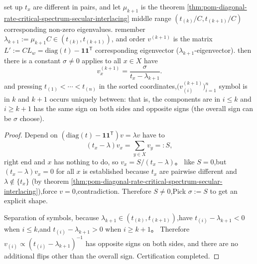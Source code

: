 \begin{proposition}\label{prop:pom-diagonal-rate-critical-eigenvector-shape-sign-separation}
set up \(t_x\) are different in pairs, and let \(\mu_{k+1}\) is the theorem \ref{thm:pom-diagonal-rate-critical-spectrum-secular-interlacing} middle range \((t_{(k)}/C,t_{(k+1)}/C)\) corresponding non-zero eigenvalues.
remember \(\lambda_{k+1}:=\mu_{k+1}C\in(t_{(k)},t_{(k+1)})\), and order \(v^{(k+1)}\) is the matrix \(L':=CL_w=\mathrm{diag}(t)-\mathbf 1\mathbf 1^{\mathsf T}\) corresponding eigenvector (\(\lambda_{k+1}\)-eigenvector).
then there is a constant \(\sigma\ne 0\) applies to all \(x\in X\) have
\[
v^{(k+1)}_x=\frac{\sigma}{t_x-\lambda_{k+1}}.
\]
and pressing \(t_{(1)}<\cdots<t_{(n)}\) in the sorted coordinates,\(\bigl(v^{(k+1)}_{(i)}\bigr)_{i=1}^n\) symbol is in \(k\) and \(k+1\) occurs uniquely between: that is, the components are in \(i\le k\) and \(i\ge k+1\) has the same sign on both sides and opposite signs (the overall sign can be \(\sigma\) choose).
\end{proposition}
\begin{proof}
Depend on \((\mathrm{diag}(t)-\mathbf 1\mathbf 1^{\mathsf T})v=\lambda v\) have to
\[
(t_x-\lambda)v_x=\sum_{y\in X}v_y=:S,
\]
right end and \(x\) has nothing to do, so \(v_x=S/(t_x-\lambda)\)。
like \(S=0\),but \((t_x-\lambda)v_x=0\) for all \(x\) is established because \(t_x\) are pairwise different and \(\lambda\notin\{t_x\}\) (by theorem \ref{thm:pom-diagonal-rate-critical-spectrum-secular-interlacing}),force \(v=0\),contradiction.
Therefore \(S\ne 0\),Pick \(\sigma:=S\) to get an explicit shape.
\par
Separation of symbols, because \(\lambda_{k+1}\in(t_{(k)},t_{(k+1)})\),have \(t_{(i)}-\lambda_{k+1}<0\) when \(i\le k\),and \(t_{(i)}-\lambda_{k+1}>0\) when \(i\ge k+1\)。
Therefore \(v_{(i)}\propto (t_{(i)}-\lambda_{k+1})^{-1}\) has opposite signs on both sides, and there are no additional flips other than the overall sign. Certification completed.
\end{proof}

